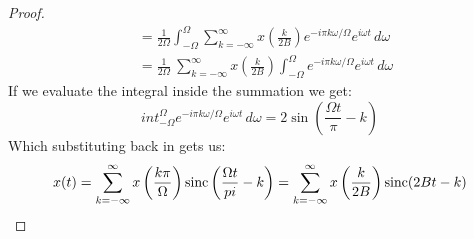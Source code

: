 \documentclass [../article.tex]{subfiles}
\begin{document}
\begin{proof}
\begin{align*}
      {} &= \frac{1}{2\Omega}\int_{-\Omega}^\Omega \sum_{k=-\infty}^\infty x\left(\frac{k}{2B}\right)e^{-i\pi k\omega/\Omega} e^{i\omega t}\,d\omega\\
      {} &= \frac{1}{2\Omega}\ \sum_{k=-\infty}^\infty x\left(\frac{k}{2B}\right)\int_{-\Omega}^\Omega e^{-i\pi k\omega/\Omega} e^{i\omega t}\,d\omega
    \end{align*}
    If we evaluate the integral inside the summation we get:
    \[int_{-\Omega}^\Omega e^{-i\pi k\omega/\Omega} e^{i\omega t}\,d\omega = 2\sin(\frac{\Omega t}{\pi}-k)\]
    Which substituting back in gets us:
    \[ x(t) = \sum_{k=-\infty}^\infty x\left(\frac{k\pi}{\Omega}\right)
    \operatorname{sinc}\left(\frac{\Omega t}{pi}-k\right) = \sum_{k=-\infty}^\infty x\left(\frac{k}{2B}\right)\operatorname{sinc}(2Bt-k) \]
  \end{proof}
\end{document}

